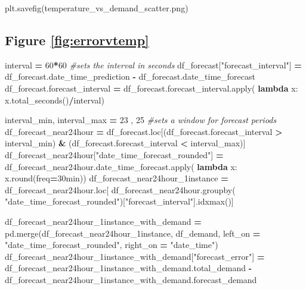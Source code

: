 \documentclass[mstat,12pt]{unswthesis}
\newenvironment{Shaded}{\begin{snugshade}}{\end{snugshade}}
\newcommand{\BuiltInTok}[1]{#1}
\newcommand{\CommentTok}[1]{\textcolor[rgb]{0.56,0.35,0.01}{\textit{#1}}}
\newcommand{\DecValTok}[1]{\textcolor[rgb]{0.00,0.00,0.81}{#1}}
\newcommand{\KeywordTok}[1]{\textcolor[rgb]{0.13,0.29,0.53}{\textbf{#1}}}
\newcommand{\NormalTok}[1]{#1}
\newcommand{\OperatorTok}[1]{\textcolor[rgb]{0.81,0.36,0.00}{\textbf{#1}}}
\newcommand{\StringTok}[1]{\textcolor[rgb]{0.31,0.60,0.02}{#1}}
\begin{document}
\begin{Shaded}
\begin{Highlighting}[]
\NormalTok{plt.savefig(}\StringTok{\textquotesingle{}temperature\_vs\_demand\_scatter.png\textquotesingle{}}\NormalTok{)}
\end{Highlighting}
\end{Shaded}

\subsection*{Figure \ref{fig:errorvtemp}}\label{figure-reffigerrorvtemp}

\begin{Shaded}
\begin{Highlighting}[]
\NormalTok{interval }\OperatorTok{=} \DecValTok{60}\OperatorTok{*}\DecValTok{60} \CommentTok{\#sets the interval in seconds}
\NormalTok{df\_forecast[}\StringTok{"forecast\_interval"}\NormalTok{] }\OperatorTok{=}\NormalTok{ df\_forecast.date\_time\_prediction }\OperatorTok{{-}} 
\NormalTok{    df\_forecast.date\_time\_forecast}
\NormalTok{df\_forecast.forecast\_interval }\OperatorTok{=}\NormalTok{ df\_forecast.forecast\_interval.}\BuiltInTok{apply}\NormalTok{(}
      \KeywordTok{lambda}\NormalTok{ x: x.total\_seconds()}\OperatorTok{/}\NormalTok{interval)}


\NormalTok{interval\_min, interval\_max }\OperatorTok{=} \DecValTok{23}\NormalTok{ , }\DecValTok{25} \CommentTok{\#sets a window for forecast periods}
\NormalTok{df\_forecast\_near24hour }\OperatorTok{=} 
\NormalTok{    df\_forecast.loc[(df\_forecast.forecast\_interval }\OperatorTok{\textgreater{}}\NormalTok{ interval\_min) }\OperatorTok{\&} 
\NormalTok{    (df\_forecast.forecast\_interval }\OperatorTok{\textless{}}\NormalTok{ interval\_max)]}
\NormalTok{df\_forecast\_near24hour[}\StringTok{"date\_time\_forecast\_rounded"}\NormalTok{] }\OperatorTok{=} 
\NormalTok{    df\_forecast\_near24hour.date\_time\_forecast.}\BuiltInTok{apply}\NormalTok{(}
        \KeywordTok{lambda}\NormalTok{ x: x.}\BuiltInTok{round}\NormalTok{(freq}\OperatorTok{=}\StringTok{\textquotesingle{}30min\textquotesingle{}}\NormalTok{))}
\NormalTok{df\_forecast\_near24hour\_1instance }\OperatorTok{=} 
\NormalTok{    df\_forecast\_near24hour.loc[}
\NormalTok{        df\_forecast\_near24hour.groupby(}
            \StringTok{"date\_time\_forecast\_rounded"}\NormalTok{)[}\StringTok{"forecast\_interval"}\NormalTok{].idxmax()]}


\NormalTok{df\_forecast\_near24hour\_1instance\_with\_demand }\OperatorTok{=} 
\NormalTok{  pd.merge(df\_forecast\_near24hour\_1instance, }
\NormalTok{    df\_demand, left\_on }\OperatorTok{=} \StringTok{"date\_time\_forecast\_rounded"}\NormalTok{, }
\NormalTok{    right\_on }\OperatorTok{=} \StringTok{"date\_time"}\NormalTok{)}
\NormalTok{df\_forecast\_near24hour\_1instance\_with\_demand[}\StringTok{"forecast\_error"}\NormalTok{] }\OperatorTok{=} 
\NormalTok{  df\_forecast\_near24hour\_1instance\_with\_demand.total\_demand }\OperatorTok{{-}} 
\NormalTok{  df\_forecast\_near24hour\_1instance\_with\_demand.forecast\_demand}


\end{Highlighting}
\end{Shaded}
\end{document}
